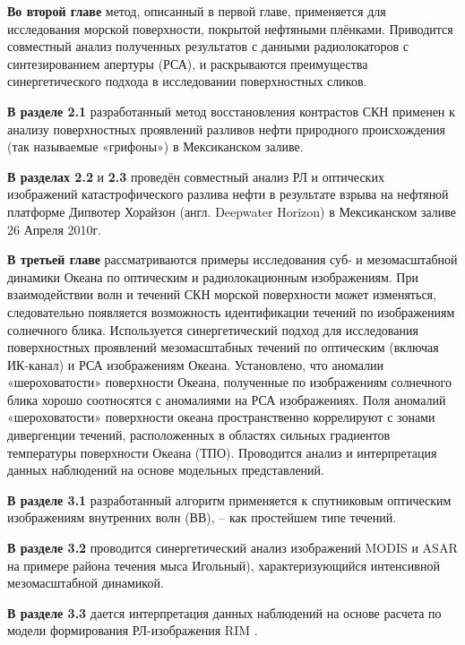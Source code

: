 \textbf{Во второй главе} метод, описанный в первой главе, применяется для исследования морской поверхности, покрытой нефтяными плёнками. Приводится совместный анализ полученных результатов с данными радиолокаторов с синтезированием апертуры (РСА), и раскрываются преимущества синергетического подхода в исследовании поверхностных сликов.

\textbf{В разделе 2.1} разработанный метод восстановления контрастов СКН применен к анализу поверхностных проявлений разливов нефти природного происхождения (так называемые «грифоны») в Мексиканском заливе.

\textbf{В разделах 2.2} и \textbf{2.3} проведён совместный анализ РЛ и оптических изображений катастрофического разлива нефти в результате взрыва на нефтяной платформе Дипвотер Хорайзон (англ. Deepwater Horizon) в Мексиканском заливе 26 Апреля 2010г.

\textbf{В третьей главе} рассматриваются примеры исследования суб- и мезомасштабной динамики Океана по оптическим и радиолокационным изображениям. При взаимодействии волн и течений СКН морской поверхности может изменяться, следовательно появляется возможность идентификации течений по изображениям солнечного блика. Используется синергетический подход для исследования поверхностных проявлений мезомасштабных течений  по оптическим (включая ИК-канал) и РСА изображениям Океана. Установлено, что аномалии «шероховатости» поверхности Океана, полученные по изображениям солнечного блика хорошо соотносятся с аномалиями на РСА изображениях. Поля аномалий «шероховатости» поверхности океана пространственно коррелируют с зонами дивергенции течений, расположенных в областях сильных градиентов температуры поверхности Океана (ТПО). Проводится анализ и интерпретация данных наблюдений на основе модельных представлений.

\textbf{В разделе 3.1} разработанный алгоритм применяется к спутниковым оптическим изображениям внутренних волн (ВВ), -- как простейшем типе течений. 

\textbf{В разделе 3.2} проводится синергетический анализ изображений MODIS и ASAR на примере района течения мыса Игольный), характеризующийся интенсивной мезомасштабной динамикой.

\textbf{В разделе 3.3} дается интерпретация данных наблюдений на основе расчета по модели формирования РЛ-изображения RIM \citep{Kudryavtsev2005,Johannessen2005}.


\clearpage